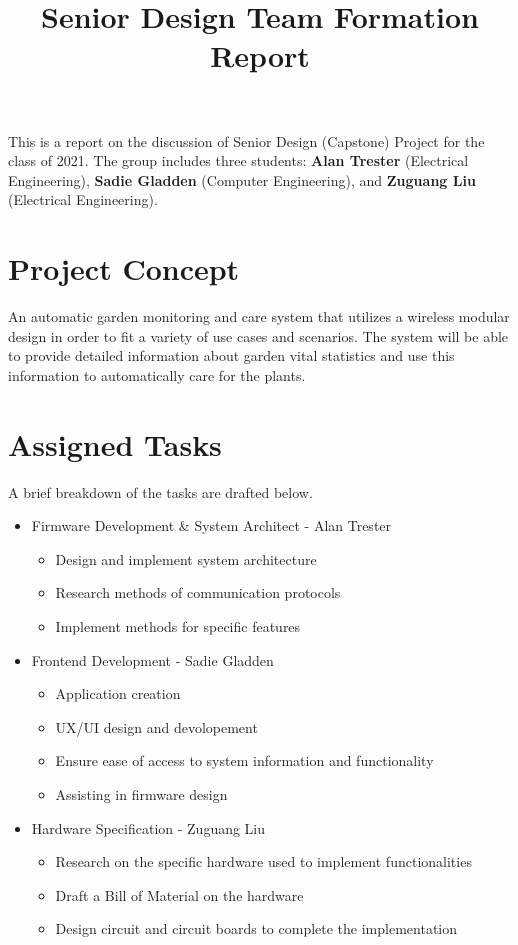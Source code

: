 \documentclass[]{article}
\title{Senior Design Team Formation Report}
\begin{document}
\maketitle

This is a report on the discussion of Senior Design (Capstone) Project for the class of 2021. The group includes three students: \textbf{Alan Trester} (Electrical Engineering), \textbf{Sadie Gladden} (Computer Engineering), and \textbf{Zuguang Liu} (Electrical Engineering).

\section{Project Concept}
An automatic garden monitoring and care system that utilizes a wireless modular design in order to fit a variety of use cases and scenarios. The system will be able to provide detailed information about garden vital statistics and use this information to automatically care for the plants.
\section{Assigned Tasks}
A brief breakdown of the tasks are drafted below.
\begin{itemize}

	\item Firmware Development \& System Architect - Alan Trester
	\begin{itemize}
		\item Design and implement system architecture 
		\item Research methods of communication protocols 
		\item Implement methods for specific features
	\end{itemize}

	\item Frontend Development - Sadie Gladden
	\begin{itemize}
		\item Application creation
		\item UX/UI design and devolopement 
		\item Ensure ease of access to system information and functionality
		\item Assisting in firmware design
	\end{itemize}

	\item Hardware Specification - Zuguang Liu
	\begin{itemize}
		\item Research on the specific hardware used to implement functionalities
		\item Draft a Bill of Material on the hardware
		\item Design circuit and circuit boards to complete the implementation
	\end{itemize}

\end{itemize}
\end{document}
